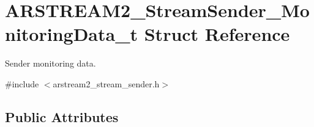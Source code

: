 \hypertarget{struct_a_r_s_t_r_e_a_m2___stream_sender___monitoring_data__t}{}\section{A\+R\+S\+T\+R\+E\+A\+M2\+\_\+\+Stream\+Sender\+\_\+\+Monitoring\+Data\+\_\+t Struct Reference}
\label{struct_a_r_s_t_r_e_a_m2___stream_sender___monitoring_data__t}


Sender monitoring data.  




{\ttfamily \#include $<$arstream2\+\_\+stream\+\_\+sender.\+h$>$}

\subsection*{Public Attributes}
